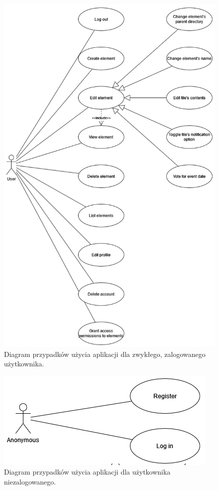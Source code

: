 \documentclass[a4paper,twoside,12pt]{book}
\begin{document}
\begin{figure}
\centering
\includegraphics[height=\textheight]{./UML-Logged.png}
\caption{Diagram przypadków użycia aplikacji dla zwykłego, zalogowanego użytkownika.}
\label{fig:uml-logged}
\end{figure}

\begin{figure}
\centering
\includegraphics{./UML-Anonymous.png}
\caption{Diagram przypadków użycia aplikacji dla użytkownika niezalogowanego.}
\label{fig:uml-anon}
\end{figure}
\end{document}
